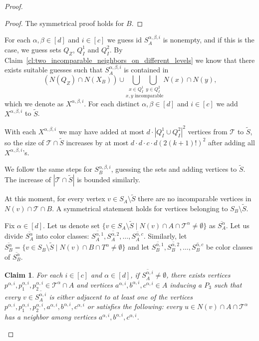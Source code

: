\documentclass[11pt,a4paper]{article}
\newtheorem{claim}[theorem]{Claim}
\theoremstyle{definition}
\renewcommand{\varnothing}{\emptyset}
\def\T{\mathcal{T}}
\begin{document}
\begin{proof}
\begin{proof}
    The symmetrical proof holds for $B$.
\end{proof}


For each $\alpha, \beta\in[d]$ and $i\in[c]$ we guess id $S_A^{\alpha, \beta, i}$ is nonempty, and if this is the case, we guess sets $Q_Z$, $Q_I^1$ and $Q_I^2$.
By Claim~\ref{cl:two_incomparable_neighbors_on_different_levels} we know that there exists suitable guesses such that $S_A^{\alpha,\beta, i}$ is contained in
$$\left(N(Q_Z)\cap N(X_B)\right)\cup \underset{x,y \text{ incomparable}}{\bigcup_{x\in Q_I^1}\bigcup_{y\in Q_I^2}} N(x)\cap N(y),$$
which we denote as $X^{\alpha, \beta, i}$. For each distinct $\alpha, \beta\in[d]$ and $i\in [c]$ we add $X^{\alpha, \beta, i}$ to $\widetilde{S}$.

With each $X^{\alpha, \beta, i}$ we may have added at most $d\cdot |Q_I^1\cup Q_I^2|^2$ vertices from $\T$ to $\widetilde{S}$, so the size of $\T \cap \widetilde{S}$ increases by at most $d\cdot d \cdot c \cdot d(2(k+1)!)^2$ after adding all $X^{\alpha, \beta, i}$'s.

We follow the same steps for $S_B^{\alpha, \beta, i}$, guessing the sets and adding vertices to $\widetilde{S}$. The increase of $|\T \cap \widetilde{S}|$ is bounded similarly.

At this moment, for every vertex $v\in S_A\setminus \widetilde{S}$ there are no incomparable vertices in $N(v)\cap \T \cap B$. A symmetrical statement holds for vertices belonging to $S_B\setminus \widetilde{S}$.

Fix $\alpha \in [d]$. Let us denote set $\{v\in S_A\setminus \widetilde{S} \mid N(v)\cap A\cap \T^\alpha\neq \varnothing\}$ as  $\overline{S_A^\alpha}$. Let us divide $\overline{S_A^\alpha}$ into color classes: $\overline{S_A^{\alpha, 1}},\overline{S_A^{\alpha,2}}, \dots, \overline{S_A^{\alpha, c}}$. 
Similarly, let $\overline{S_B^\alpha}=\{v\in S_B\setminus \widetilde{S}\mid N(v)\cap B\cap T^\alpha\neq\varnothing\}$ and let $\overline{S_B^{\alpha, 1}}, \overline{S_B^{\alpha, 2}}, \dots, \overline{S_B^{\alpha, c}}$ be color classes of $\overline{S_B^{\alpha}}$.

\begin{claim}\label{cl:neighbors_in_my_part_on_the_same_level1}
For each $i \in [c]$ and $\alpha \in [d]$,
if $\overline{S_A^{\alpha,i}} \neq \emptyset$, there exists 
vertices $p^{\alpha,i},p_1^{\alpha,i},p_2^{\alpha,i} \in \T^\alpha \cap A$
and 
vertices $a^{\alpha,i},b^{\alpha,i},c^{\alpha,i} \in A$ inducing a $P_3$
such that every $v \in \overline{S_A^{\alpha,i}}$ is either
adjacent to at least one of the vertices 
$p^{\alpha,i},p_1^{\alpha,i},p_2^{\alpha,i},a^{\alpha,i},b^{\alpha,i},c^{\alpha,i}$
or satisfies the following: every $u \in N(v) \cap A \cap \T^\alpha$ 
has a neighbor among vertices $a^{\alpha,i},b^{\alpha,i},c^{\alpha,i}$.


\end{claim}
\end{proof}
\end{document}
